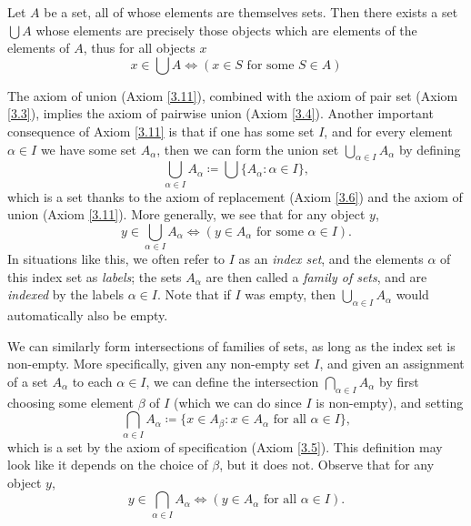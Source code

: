 \begin{axiom}[Union]\label{3.11}
    Let \(A\) be a set, all of whose elements are themselves sets.
    Then there exists a set \(\bigcup A\) whose elements are precisely those objects which are elements of the elements of \(A\), thus for all objects \(x\)
    \[
        x \in \bigcup A \iff (x \in S \text{ for some } S \in A)
    \]
\end{axiom}

\begin{note}
    The axiom of union (Axiom \ref{3.11}), combined with the axiom of pair set (Axiom \ref{3.3}), implies the axiom of pairwise union (Axiom \ref{3.4}).
    Another important consequence of Axiom \ref{3.11} is that if one has some set \(I\), and for every element \(\alpha \in I\) we have some set \(A_{\alpha}\), then we can form the union set \(\bigcup_{\alpha \in I} A_{\alpha}\) by defining
    \[
        \bigcup_{\alpha \in I} A_{\alpha} \coloneqq \bigcup \{A_{\alpha} : \alpha \in I\},
    \]
    which is a set thanks to the axiom of replacement (Axiom \ref{3.6}) and the axiom of union (Axiom \ref{3.11}).
    More generally, we see that for any object \(y\),
    \[
        y \in \bigcup_{\alpha \in I} A_{\alpha} \iff (y \in A_{\alpha} \text{ for some } \alpha \in I).
    \]
    In situations like this, we often refer to \(I\) as an \emph{index set}, and the elements \(\alpha\) of this index set as \emph{labels};
    the sets \(A_{\alpha}\) are then called a \emph{family of sets}, and are \emph{indexed} by the labels \(\alpha \in I\).
    Note that if \(I\) was empty, then \(\bigcup_{\alpha \in I} A_{\alpha}\) would automatically also be empty.
\end{note}

\begin{note}
    We can similarly form intersections of families of sets, as long as the index set is non-empty.
    More specifically, given any non-empty set \(I\), and given an assignment of a set \(A_{\alpha}\) to each \(\alpha \in I\), we can define the intersection \(\bigcap_{\alpha \in I} A_{\alpha}\) by first choosing some element \(\beta\) of \(I\) (which we can do since \(I\) is non-empty), and setting
    \[
        \bigcap_{\alpha \in I} A_{\alpha} \coloneqq \{x \in A_{\beta} : x \in A_{\alpha} \text{ for all } \alpha \in I\},
    \]
    which is a set by the axiom of specification (Axiom \ref{3.5}).
    This definition may look like it depends on the choice of \(\beta\), but it does not.
    Observe that for any object \(y\),
    \[
        y \in \bigcap_{\alpha \in I} A_{\alpha} \iff (y \in A_{\alpha} \text{ for all } \alpha \in I).
    \]
\end{note}


